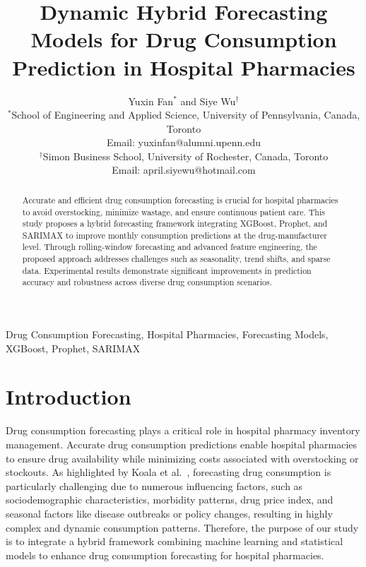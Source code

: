 \documentclass[journal]{IEEEtran}
\begin{document}
\title{Dynamic Hybrid Forecasting Models for Drug Consumption Prediction in Hospital Pharmacies}

\author{Yuxin Fan$^{*}$ and Siye Wu$^{\dagger}$ \\
$^{*}$School of Engineering and Applied Science, University of Pennsylvania, Canada, Toronto \\
Email: yuxinfan@alumni.upenn.edu \\
$^{\dagger}$Simon Business School, University of Rochester, Canada, Toronto \\
Email: april.siyewu@hotmail.com}

\maketitle

\begin{abstract}
Accurate and efficient drug consumption forecasting is crucial for hospital pharmacies to avoid overstocking, minimize wastage, and ensure continuous patient care. This study proposes a hybrid forecasting framework integrating XGBoost, Prophet, and SARIMAX to improve monthly consumption predictions at the drug-manufacturer level. Through rolling-window forecasting and advanced feature engineering, the proposed approach addresses challenges such as seasonality, trend shifts, and sparse data. Experimental results demonstrate significant improvements in prediction accuracy and robustness across diverse drug consumption scenarios.
\end{abstract}

\begin{IEEEkeywords}
Drug Consumption Forecasting, Hospital Pharmacies, Forecasting Models, XGBoost, Prophet, SARIMAX
\end{IEEEkeywords}

\section{Introduction}

Drug consumption forecasting plays a critical role in hospital pharmacy inventory management. Accurate drug consumption predictions enable hospital pharmacies to ensure drug availability while minimizing costs associated with overstocking or stockouts. As highlighted by Koala et al.~\cite{koala2021factors}, forecasting drug consumption is particularly challenging due to numerous influencing factors, such as sociodemographic characteristics, morbidity patterns, drug price index, and seasonal factors like disease outbreaks or policy changes, resulting in highly complex and dynamic consumption patterns. Therefore, the purpose of our study is to integrate a hybrid framework combining machine learning and statistical models to enhance drug consumption forecasting for hospital pharmacies.
\end{document}
